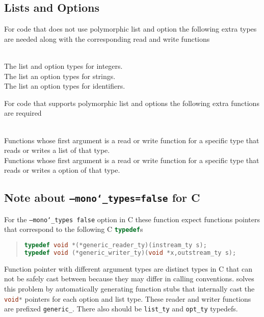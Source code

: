 \subsection{Lists and Options}
For code that does not use polymorphic list and option the following extra
types are needed along with the corresponding read and write functions
\begin{description}
   \mbox{}\\
    The list and option types for integers.
   \mbox{}\\
    The list an option types for strings.
   \mbox{}\\
    The list an option types for identifiers.
\end{description}%

For code that supports polymorphic list and options the following extra
functions are required

\begin{description}
   \mbox{}\\
    Functions whose first argument is a read or write
    function for a specific type that reads or writes a list of that type.
   \mbox{}\\
    Functions whose first argument is a read or write
    function for a specific type that reads or writes a option of that type.
\end{description}%

\subsection{Note about \texttt{--mono\char`\_types=false} for C}
For the \texttt{--mono\char`\_types false} option in C these function expect functions
pointers that correspond to the following C \lstinline[language=c]!typedef!s
%
\begin{quote}\begin{lstlisting}[language=c]
typedef void *(*generic_reader_ty)(instream_ty s);
typedef void (*generic_writer_ty)(void *x,outstream_ty s);
\end{lstlisting}\end{quote}%

Function pointer with different argument types are distinct types in C that
can not be safely cast between because they may differ in calling
conventions. \asdlgen{} solves this problem by automatically generating
function stubs that internally cast the \lstinline[language=c]!void*! pointers for each option
and list type. These reader and writer functions are prefixed
\lstinline[language=c]!generic_!. There also should be \lstinline[language=c]!list_ty!
and \lstinline[language=c]!opt_ty! typedefs.

